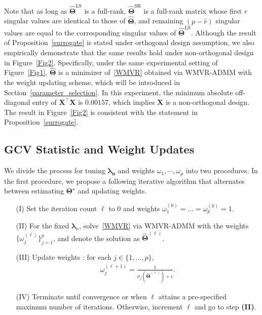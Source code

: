 \documentclass[alpha-refs]{wiley-article}
\begin{document}
Note that as long as $\widehat{\boldsymbol{\Theta}}^{\text{LS}}$ is a full-rank, $\widehat{\boldsymbol{\Theta}}^{\text{SR}}$ is a full-rank matrix whose first $\widehat{r}$ singular values are identical to those of $\widehat{\boldsymbol{\Theta}}$, and remaining $(p-\widehat{r})$ singular values are equal to the  corresponding singular values of $\widehat{\boldsymbol{\Theta}}^{\text{LS}}$.
Although the result of Proposition~\ref{surrogate} is stated under orthogonal design assumption, we also empirically demonstrate that the same results hold under non-orthogonal design in Figure~\ref{Fig2}.
Specifically, under the same experimental setting of Figure~\ref{Fig1}, $\widehat{\boldsymbol{\Theta}}$ is a minimizer of~\eqref{WMVR} obtained via WMVR-ADMM with the weight updating scheme, which will be introduced in Section~\ref{parameter_selection}.
In this experiment, the minimum absolute off-diagonal entry of $\boldsymbol{X}^{\top}\boldsymbol{X}$ is $0.00157$, which implies $\boldsymbol{X}$ is a non-orthogonal design.
The result in Figure~\ref{Fig2} is consistent with the statement in Proposition~\ref{surrogate}.

\subsection{GCV Statistic and Weight Updates}
We divide the process for tuning $\boldsymbol{\lambda_{n}}$ and weights $\omega_{1}, \cdots, \omega_{p}$ into two procedures.
In the first procedure, we propose a following iterative algorithm that alternates between estimating $\boldsymbol{\Theta}^{\star}$ and updating weights.
\begin{enumerate}
    \item[(I)] Set the iteration count $\ell$ to $0$ and weights $\omega_{1}^{(0)}=\dots=\omega_{p}^{(0)}=1$.
    \item[(II)] For the fixed $\boldsymbol{\lambda}_{n}$, solve~\eqref{WMVR} via WMVR-ADMM with the weights $\{\omega_{j}^{(\ell)}\}_{j=1}^{p}$, and denote the solution as  $\widehat{\boldsymbol{\Theta}}^{(\ell)}$.
    \item[(III)] Update weights : for each $j\in\{1,\dots,p\}$,
    \begin{align} \label{weight}
        \omega_{j}^{(\ell+1)}=\frac{1}{\sigma_{j}(\widehat{\boldsymbol{\Theta}}^{(\ell)})+\epsilon}.
    \end{align}
    \item[(IV)] Terminate until convergence or when $\ell$ attains a pre-specified maximum number of iterations.
    Otherwise, increment $\ell$ and go to step {\bf(II)}.
\end{enumerate}
\end{document}
